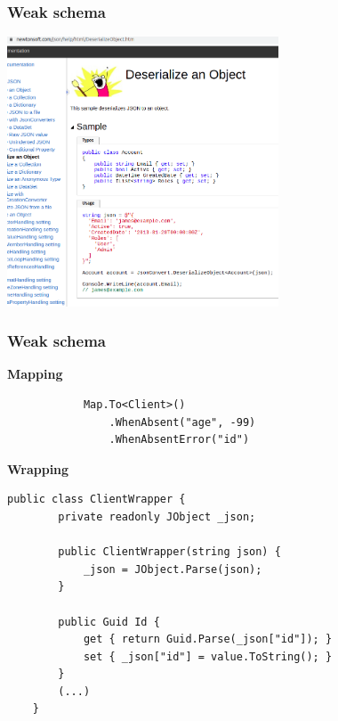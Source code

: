 \documentclass{beamer}
\begin{document}
\begin{frame}

    \frametitle{\textbf{Weak schema}}
    \includegraphics[height=8cm]{newtonsoft.png}

\end{frame}

\begin{frame}[fragile]

    \frametitle{\textbf{Weak schema}}

    \begin{flushleft}
        \textbf{\LARGE{Mapping}}
        \vskip 1mm
        \begin{lstlisting}
            Map.To<Client>()
                .WhenAbsent("age", -99)
                .WhenAbsentError("id")\end{lstlisting}

        \textbf{\LARGE{Wrapping}}
        \vskip 1mm
        \begin{lstlisting}[basicstyle=\scriptsize]
    public class ClientWrapper {
        private readonly JObject _json;

        public ClientWrapper(string json) {
            _json = JObject.Parse(json);
        }

        public Guid Id {
            get { return Guid.Parse(_json["id"]); }
            set { _json["id"] = value.ToString(); }
        }
        (...)
    }\end{lstlisting}
    \end{flushleft}

\end{frame}
\end{document}
